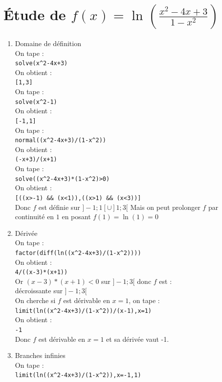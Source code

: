 \documentclass[a4paper,11pt]{book}
\begin{document}
\section{\'Etude de $\displaystyle f(x)=\ln(\frac{x^2-4x+3}{1-x^2})$}
\begin{enumerate}
\item Domaine de d\'efinition\\
On tape :\\
{\tt solve(x\verb|^|2-4x+3)}\\
On obtient :\\
{\tt [1,3]}\\
On tape :\\
{\tt solve(x\verb|^|2-1)}\\
On obtient :\\
{\tt [-1,1]}\\
On tape :\\
{\tt normal((x\verb|^|2-4x+3)/(1-x\verb|^|2))}\\
On obtient :\\
{\tt (-x+3)/(x+1)}\\
On tape :\\
{\tt solve((x\verb|^|2-4x+3)*(1-x\verb|^|2)>0)}\\
On obtient :\\
{\tt [((x>-1) \&\& (x<1)),((x>1) \&\& (x<3))]}\\
Donc $f$ est d\'efinie sur $]-1;1[\cup]1;3[$
Mais on peut prolonger $f$ par continuit\'e en $1$ en posant $f(1)=\ln(1)=0$
\item D\'eriv\'ee\\
On tape :\\
{\tt factor(diff(ln((x\verb|^|2-4x+3)/(1-x\verb|^|2))))}\\
On obtient :\\
{\tt 4/((x-3)*(x+1))}\\
Or $(x-3)*(x+1)<0$ sur  $]-1; 3[$ donc $f$ est :\\
d\'ecroissante sur $]-1; 3[$\\
On cherche si $f$ est d\'erivable en $x=1$, on tape :\\
{\tt limit(ln((x\verb|^|2-4x+3)/(1-x\verb|^|2))/(x-1),x=1)}\\
On obtient :\\
{\tt -1}\\
Donc $f$ est d\'erivable en $x=1$ et sa d\'eriv\'ee vaut -1.
\item Branches infinies\\
On tape :\\
{\tt limit(ln((x\verb|^|2-4x+3)/(1-x\verb|^|2)),x=-1,1)}\\

\end{enumerate}
\end{document}
